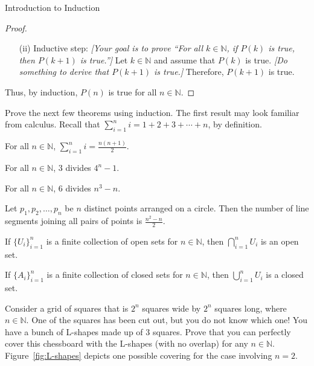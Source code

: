 \begin{section}{Introduction to Induction}
\begin{skeleton}
\begin{center}
{\begin{minipage}{6in}
\begin{proof}
\begin{enumerate}
\item[(ii)] Inductive step:  \emph{[Your goal is to prove ``For all $k\in\mathbb{N}$, if $P(k)$ is true, then $P(k+1)$ is true.'']} Let $k\in\mathbb{N}$ and assume that $P(k)$ is true. \emph{[Do something to derive that $P(k+1)$ is true.]} Therefore, $P(k+1)$ is true.
\end{enumerate}
Thus, by induction, $P(n)$ is true for all $n\in\mathbb{N}$.
\end{proof}
\end{minipage}
}
\end{center}
\end{skeleton}

Prove the next few theorems using induction.  The first result may look familiar from calculus. Recall that $\displaystyle \sum_{i=1}^{n}i=1+2+3+\cdots +n$, by definition.

\begin{theorem}
For all $n\in\mathbb{N}$, $\displaystyle \sum_{i=1}^{n}i=\frac{n(n+1)}{2}$.
\end{theorem}

\begin{theorem}
For all $n\in\mathbb{N}$, 3 divides $4^{n}-1$.
\end{theorem}

\begin{theorem}
For all $n\in\mathbb{N}$, 6 divides $n^{3}-n$.
\end{theorem}

\begin{theorem}
Let $p_{1}, p_{2}, \ldots, p_{n}$ be $n$ distinct points arranged on a circle.  Then the number of line segments joining all pairs of points is $\frac{n^{2}-n}{2}$.
\end{theorem}

\begin{theorem}
If $\{U_{i}\}_{i=1}^n$ is a finite collection of open sets for $n\in \mathbb{N}$, then $\bigcap_{i=1}^n U_{i}$ is an open set.
\end{theorem}

\begin{theorem}
If $\{A_{i}\}_{i=1}^n$ is a finite collection of closed sets for $n\in \mathbb{N}$, then $\bigcup_{i=1}^n U_{i}$ is a closed set.
\end{theorem}

\begin{problem}\label{prob:L-shapes}
Consider a grid of squares that is $2^n$ squares wide by $2^n$ squares long, where $n\in\mathbb{N}$. One of the squares has been cut out, but you do not know which one!  You have a bunch of L-shapes made up of $3$ squares.  Prove that you can perfectly cover this chessboard with the L-shapes (with no overlap) for any $n\in\mathbb{N}$. Figure~\ref{fig:L-shapes} depicts one possible covering for the case involving $n=2$.
\end{problem}


\end{section}
